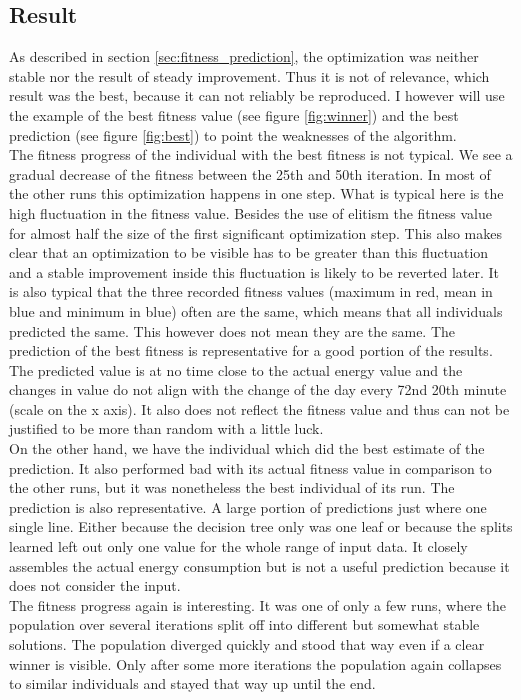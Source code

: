 \documentclass[conference]{IEEEtran}
\begin{document}
\subsection{Result}
As described in section \ref{sec:fitness_prediction}, the optimization was neither stable nor the result of steady improvement. Thus it is not of relevance, which result was the best, because it can not reliably be reproduced. I however will use the example of the best fitness value (see figure \ref{fig:winner}) and the best prediction (see figure \ref{fig:best}) to point the weaknesses of the algorithm.\\
The fitness progress of the individual with the best fitness is not typical. We see a gradual decrease of the fitness between the 25th and 50th iteration. In most of the other runs this optimization happens in one step. What is typical here is the high fluctuation in the fitness value. Besides the use of elitism the fitness value for almost half the size of the first significant optimization step. This also makes clear that an optimization to be visible has to be greater than this fluctuation and a stable improvement inside this fluctuation is likely to be reverted later. It is also typical that the three recorded fitness values (maximum in red, mean in blue and minimum in blue) often are the same, which means that all individuals predicted the same. This however does not mean they are the same. The prediction of the best fitness is representative for a good portion of the results. The predicted value is at no time close to the actual energy value and the changes in value do not align with the change of the day every 72nd 20th minute (scale on the x axis). It also does not reflect the fitness value and thus can not be justified to be more than random with a little luck.\\
On the other hand, we have the individual which did the best estimate of the prediction. It also performed bad with its actual fitness value in comparison to the other runs, but it was nonetheless the best individual of its run. The prediction is also representative. A large portion of predictions just where one single line. Either because the decision tree only was one leaf or because the splits learned left out only one value for the whole range of input data. It closely assembles the actual energy consumption but is not a useful prediction because it does not consider the input.\\
The fitness progress again is interesting. It was one of only a few runs, where the population over several iterations split off into different but somewhat stable solutions. The population diverged quickly and stood that way even if a clear winner is visible. Only after some more iterations the population again collapses to similar individuals and stayed that way up until the end.
\end{document}
